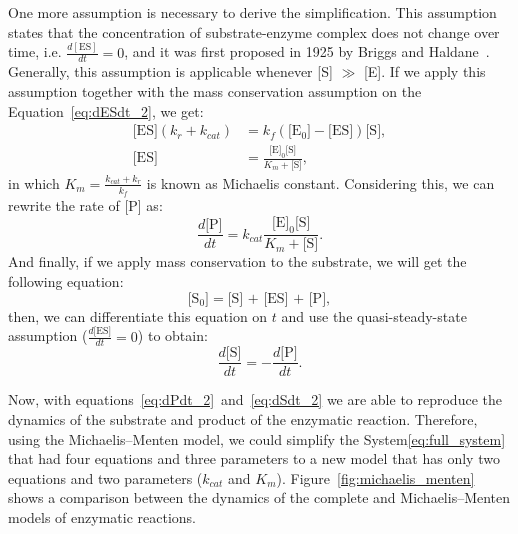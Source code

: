 One more assumption is necessary to derive the simplification. This 
assumption states that the concentration of substrate-enzyme complex
does not change over time, i.e. $\frac{d[\text{ES}]}{dt} = 0$, and it 
was first proposed in 1925 by Briggs and Haldane~\cite{Briggs1925}. 
Generally, this assumption is applicable whenever [S] $\gg$ [E]. 
If we apply this assumption together with the mass conservation 
assumption on the Equation~\ref{eq:dESdt_2}, we get:
\begin{equation}  
    \begin{aligned}
        \text{[ES]} (k_r + k_{cat}) &= 
            k_f(\text{[E$_0$]} - \text{[ES]})\text{[S]}, \\
        \text{[ES]} &= \frac{\text{[E]}_0\text{[S]}}{K_m + \text{[S]}}, 
    \end{aligned}
\end{equation}
in which $K_m = \frac{k_{cat} + k_r}{k_f}$ is known as Michaelis 
constant. Considering this, we can rewrite the rate of [P] as:
\begin{equation}
    \frac{d\text{[P]}}{dt} = k_{cat}\frac{\text{[E]}_0\text{[S]}}
        {K_m + \text{[S]}}.
    \label{eq:dPdt_2}
\end{equation}
And finally, if we apply mass conservation to the substrate, we will get
the following equation:
\begin{equation}
    \text{[S$_0$]} = \text{[S] + [ES] + [P]},
\end{equation}
then, we can differentiate this equation on $t$ and use the 
quasi-steady-state assumption ($\frac{d\text{[ES]}}{dt} = 0$) to obtain:
\begin{equation}
    \frac{d\text{[S]}}{dt} = - \frac{d\text{[P]}}{dt}.
    \label{eq:dSdt_2}
\end{equation}

Now, with equations~\ref{eq:dPdt_2}~and~\ref{eq:dSdt_2} we are able to
reproduce the dynamics of the substrate and product of the enzymatic 
reaction. Therefore, using the Michaelis--Menten model, we could simplify 
the System\ref{eq:full_system} that had four equations and three 
parameters to a new model that has only two equations and two parameters 
($k_{cat}$ and $K_m$). Figure~\ref{fig:michaelis_menten} shows a 
comparison between the dynamics of the complete and Michaelis--Menten 
models of enzymatic reactions.

